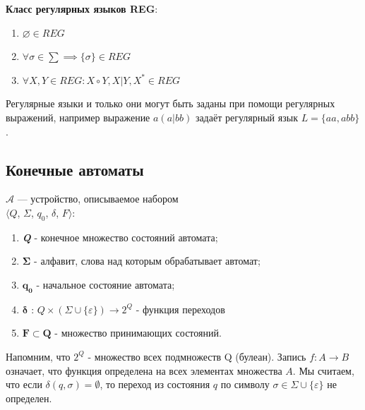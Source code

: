 \begin{multicols}{2}
  \begin{definition}{}{}
      \textbf{Класс регулярных языков REG}:
  \end{definition}
  \begin{enumerate}
      \item $\varnothing \in REG$
      \item $\forall\sigma \in \sum \implies \{\sigma\} \in  REG$
      \item $\forall X, Y \in REG: X \circ Y, X|Y, X^* \in REG$
  \end{enumerate}
  
  Регулярные языки и только они могут быть заданы при помощи регулярных выражений, например выражение $a(a|bb)$ задаёт регулярный язык $L = \{aa, abb\}$.
  \subsection*{Конечные автоматы}
  \begin{definition}{}{}
    \textbf{} $\mathcal{A}$ --- устройство, описываемое набором \\$\langle Q$, $\Sigma$, $q_0$, $\delta$, $F \rangle$:
    \begin{enumerate}
        \item {\bfseries\itshape{Q}} - конечное множество состояний автомата;
        \item $\boldsymbol{\Sigma}$ - алфавит, слова над которым обрабатывает автомат;
        \item $\boldsymbol{q_0}$ - начальное состояние автомата;
        \item $\boldsymbol{\delta}$ : $Q \times (\Sigma\cup\{\varepsilon\} ) \rightarrow 2^{Q}$ - функция переходов
        \item $\boldsymbol{F} \subset \boldsymbol{Q}$ - множество принимающих состояний.
    \end{enumerate}
\end{definition}

Напомним, что $2^Q$ - множество всех подмножеств Q (булеан). Запись $f: A \rightarrow B $ означает, что функция определена на всех элементах множества $A$. Мы считаем, что если $\delta (q,\sigma) = \emptyset$, то переход из состояния $q$  по символу $\sigma \in \Sigma \cup \{ \varepsilon \}$ не  определен.



\end{multicols}
